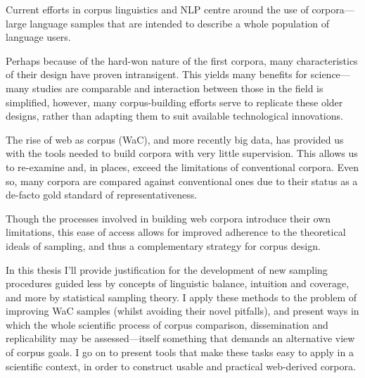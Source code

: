 Current efforts in corpus linguistics and NLP centre around the use of corpora---large language samples that are intended to describe a whole population of language users.


Perhaps because of the hard-won nature of the first corpora, many characteristics of their design have proven intransigent.  This yields many benefits for science---many studies are comparable and interaction between those in the field is simplified, however, many corpus-building efforts serve to replicate these older designs, rather than adapting them to suit available technological innovations.

The rise of web as corpus (WaC), and more recently big data, has provided us with the tools needed to build corpora with very little supervision.  This allows us to re-examine and, in places, exceed the limitations of conventional corpora.  Even so, many corpora are compared against conventional ones due to their status as a de-facto gold standard of representativeness.

Though the processes involved in building web corpora introduce their own limitations, this ease of access allows for improved adherence to the theoretical ideals of sampling, and thus a complementary strategy for corpus design.


In this thesis I'll provide justification for the development of new sampling procedures guided less by concepts of linguistic balance, intuition and coverage, and more by statistical sampling theory.  I apply these methods to the problem of improving WaC samples (whilst avoiding their novel pitfalls), and present ways in which the whole scientific process of corpus comparison, dissemination and replicability may be assessed---itself something that demands an alternative view of corpus goals.  I go on to present tools that make these tasks easy to apply in a scientific context, in order to construct usable and practical web-derived corpora.



